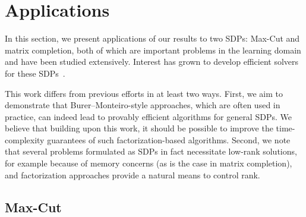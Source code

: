 \section{Applications}\label{sec:applications}

In this section, we present applications of our results to two SDPs: Max-Cut and matrix completion, both of which are important problems in the learning domain and have been studied extensively. Interest has grown to develop efficient solvers for these SDPs~\citep{arora2007combinatorial, pmlr-v65-mei17a, hardt2013understanding, bandeira2016low}.

This work differs from previous efforts in at least two ways. First, we aim to demonstrate that Burer--Monteiro-style approaches, which are often used in practice, can indeed lead to provably efficient algorithms for general SDPs. We believe that building upon this work, it should be possible to improve the time-complexity guarantees of such factorization-based algorithms. Second, we note that several problems formulated as SDPs in fact necessitate low-rank solutions, for example because of memory concerns (as is the case in matrix completion),  and factorization approaches provide a natural means to control rank. %

\subsection{Max-Cut}


